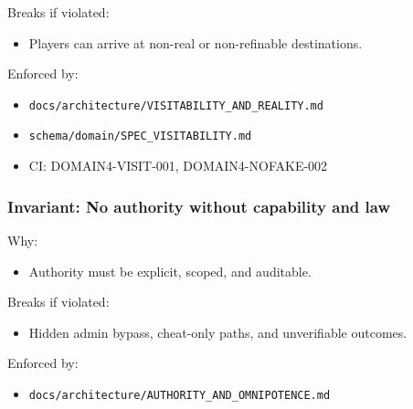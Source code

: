 \documentclass[9pt,a4paper,openany]{book}
\begin{document}
Breaks if violated:



\begin{itemize}
\item Players can arrive at non-\allowbreak{}real or non-\allowbreak{}refinable destinations.\allowbreak{}
\end{itemize}


Enforced by:



\begin{itemize}
\item \texttt{docs/\allowbreak{}architecture/\allowbreak{}VISITABILITY\_\allowbreak{}AND\_\allowbreak{}REALITY.\allowbreak{}md}
\end{itemize}


\begin{itemize}
\item \texttt{schema/\allowbreak{}domain/\allowbreak{}SPEC\_\allowbreak{}VISITABILITY.\allowbreak{}md}
\end{itemize}


\begin{itemize}
\item CI: DOMAIN4-\allowbreak{}VISIT-\allowbreak{}001, DOMAIN4-\allowbreak{}NOFAKE-\allowbreak{}002
\end{itemize}





\subsubsection{Invariant: No authority without capability and law}


Why:



\begin{itemize}
\item Authority must be explicit, scoped, and auditable.\allowbreak{}
\end{itemize}


Breaks if violated:



\begin{itemize}
\item Hidden admin bypass, cheat-\allowbreak{}only paths, and unverifiable outcomes.\allowbreak{}
\end{itemize}


Enforced by:



\begin{itemize}
\item \texttt{docs/\allowbreak{}architecture/\allowbreak{}AUTHORITY\_\allowbreak{}AND\_\allowbreak{}OMNIPOTENCE.\allowbreak{}md}
\end{itemize}
\end{document}
